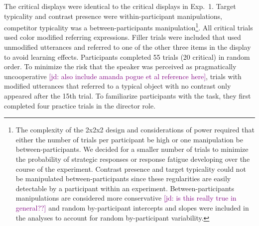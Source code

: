 \documentclass[10pt,letterpaper]{article}
\newcommand{\jd}[1]{\textcolor{Purple}{[jd: #1]}}
\begin{document}
The critical displays were identical to the critical displays in Exp.~1. Target typicality and contrast presence were within-participant manipulations, competitor typicality was a between-participants manipulation\footnote{The complexity of the 2x2x2 design and considerations of power required that either the number of trials per participant  be high or one manipulation  be between-participants. We decided for a smaller number of trials to minimize the probability of strategic responses or response fatigue developing over the course of the experiment. Contrast presence and target typicality could not be manipulated between-participants since these regularities are easily detectable by a participant within an experiment. Between-participants manipulations are considered more conservative \cite{Charness:2012} \jd{is this really true in general??} and random by-participant intercepts and slopes were included in the analyses to account for random by-participant variability.}. All critical trials used color modified referring expressions. 
Filler trials were included that used unmodified utterances and referred to one of the other three items in the display to avoid learning effects. 
Participants completed 55 trials (20 critical) in random order. To minimize the risk that the speaker was perceived as pragmatically uncooperative \cite{Grodner:2011,Ryskin:2019} \jd{also include amanda pogue et al reference here}, trials with modified utterances that referred to a typical object with no contrast only appeared after the 15th trial. To familiarize participants with the task, they first completed four practice trials in the director role.
 
 


\end{document}
